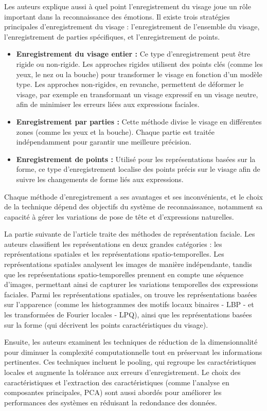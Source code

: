 \documentclass{rapport}
\begin{document}
Les auteurs explique aussi à quel point l'enregistrement du visage joue un rôle
important dans la reconnaissance des émotions. Il existe trois stratégies
principales d'enregistrement du visage : l'enregistrement de l’ensemble du visage,
l’enregistrement de parties spécifiques, et l’enregistrement de points.
\begin{itemize}
    \item \textbf{Enregistrement du visage entier :} Ce type d’enregistrement peut être rigide ou 
non-rigide. Les approches rigides utilisent des points clés (comme les yeux, 
le nez ou la bouche) pour transformer le visage en fonction d’un modèle type. 
Les approches non-rigides, en revanche, permettent de déformer le visage, par 
exemple en transformant un visage expressif en un visage neutre, afin de minimiser 
les erreurs liées aux expressions faciales.
    \item \textbf{Enregistrement par parties :} Cette méthode divise le visage 
en différentes zones (comme les yeux et la bouche). Chaque partie 
est traitée indépendamment pour garantir une meilleure précision.
    \item \textbf{Enregistrement de points :} Utilisé pour les représentations 
basées sur la forme, ce type d'enregistrement localise des points 
précis sur le visage afin de suivre les changements de forme liés 
aux expressions.
\end{itemize}
Chaque méthode d'enregistrement a ses avantages et ses inconvénients, et le choix 
de la technique dépend des objectifs du système de reconnaissance, notamment sa 
capacité à gérer les variations de pose de tête et d'expressions naturelles.

La partie suivante de l'article traite des méthodes de représentation faciale.
Les auteurs classifient les représentations en deux grandes catégories : les
représentations spatiales et les représentations spatio-temporelles. Les
représentations spatiales analysent les images de manière indépendante, tandis que
les représentations spatio-temporelles prennent en compte une séquence d'images,
permettant ainsi de capturer les variations temporelles des expressions faciales.
Parmi les représentations spatiales, on trouve les représentations basées sur
l'apparence (comme les histogrammes des motifs locaux binaires - LBP - et les
transformées de Fourier locales - LPQ), ainsi que les représentations basées sur la
forme (qui décrivent les points caractéristiques du visage).

Ensuite, les auteurs examinent les techniques de réduction de la dimensionnalité
pour diminuer la complexité computationnelle tout en préservant les informations
pertinentes. Ces techniques incluent le pooling, qui regroupe les caractéristiques
locales et augmente la tolérance aux erreurs d'enregistrement. Le choix des
caractéristiques et l'extraction des caractéristiques (comme l'analyse en
composantes principales, PCA) sont aussi abordés pour améliorer les performances
des systèmes en réduisant la redondance des données.
\end{document}
